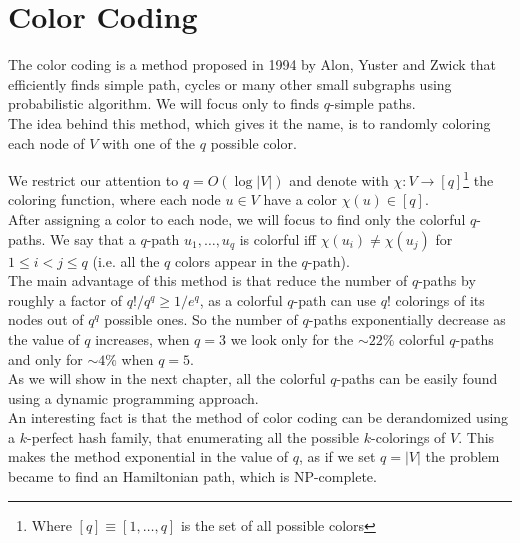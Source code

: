 \section{Color Coding}

The color coding is a method proposed in 1994 by Alon, Yuster and Zwick\cite{Alon:1995:COL:210332.210337} that efficiently finds simple path, cycles or many other small subgraphs using probabilistic algorithm. We will focus only to finds $q$-simple paths.\\

The idea behind this method, which gives it the name, is to randomly coloring each node of $V$ with one of the $q$ possible color.

We restrict our attention to $q = O(\log |V|)$ and denote with $\chi : V \rightarrow [q]$\footnote{Where $[q] \equiv [1, \ldots, q]$ is the set of all possible colors} the coloring function, where each node $u \in V$ have a color $\chi(u) \in [q]$.\\

After assigning a color to each node, we will focus to find only the colorful $q$-paths. We say that a $q$-path $u_{1}, \ldots, u_{q}$ is colorful iff $\chi(u_{i}) \neq \chi(u_{j})$ for $1 \leq i < j \leq q$ (i.e. all the $q$ colors appear in the $q$-path).\\

The main advantage of this method is that reduce the number of $q$-paths by roughly a factor of $q! / q^{q} \geq 1/e^{q}$, as a colorful $q$-path can use $q!$ colorings of its nodes out of $q^{q}$ possible ones. So the number of $q$-paths exponentially decrease as the value of $q$ increases, when $q = 3$ we look only for the $\sim22\%$ colorful $q$-paths and only for $\sim4\%$ when $q = 5$.\\

As we will show in the next chapter, all the colorful $q$-paths can be easily found using a dynamic programming approach.\\

An interesting fact is that the method of color coding can be derandomized using a $k$-perfect hash family\cite{Alon:1995:COL:210332.210337}, that enumerating all the possible $k$-colorings of $V$.
This makes the method exponential in the value of $q$, as if we set $q = |V|$ the problem became to find an Hamiltonian path, which is NP-complete\cite{GareyJohnson:1979}.\\

